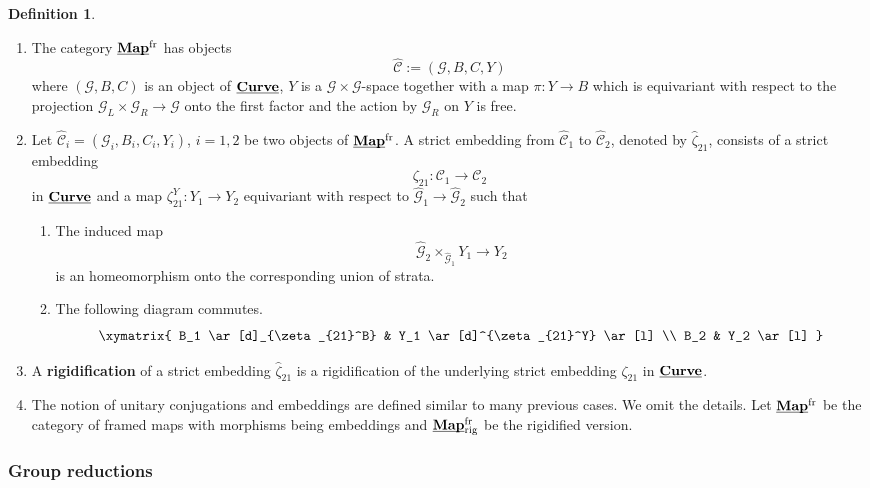 \documentclass[reqno, 10pt]{amsart}
\numberwithin{equation}{section}
\numberwithin{equation}{section}
\theoremstyle{definition}
\newtheorem{defn}[thm]{Definition}
\theoremstyle{remark}
\newcommand{\beqn}{\begin{equation*}}
\newcommand{\eeqn}{\end{equation*}}
\newcommand{\mc}{\mathcal}
\newcommand{\uds}[1]{\underline{\smash{#1}}}
\begin{document}
\begin{defn}\label{defn156}
\begin{enumerate}

\item The category $\uds{\bf Map}^{\rm fr}$ has objects
\beqn
\hat {\mc C}:= ({\mc G}, B, C, Y)
\eeqn
where $({\mc G}, B, C)$ is an object of $\uds{\bf Curve}$, $Y$ is a ${\mc G}\times {\mc G}$-space together with a map $\pi: Y  \to B$ which is equivariant with respect to the projection ${\mc G}_L \times {\mc G}_R \to {\mc G}$ onto the first factor and the action by ${\mc G}_R$ on $Y$ is free.  

\item Let $\hat {\mc C}_i = ({\mc G}_i, B_i, C_i, Y_i)$, $i = 1, 2$ be two objects of $\uds{\bf Map}^{\rm fr}$. A strict embedding from $\hat{\mc C}_1$ to $\hat {\mc C}_2$, denoted by $\hat \zeta_{21}$, consists of a strict embedding
\beqn
\zeta_{21}: {\mc C}_1 \to {\mc C}_2
\eeqn
in $\uds{\bf Curve}$ and a map $\zeta_{21}^Y: Y_1 \to Y_2$ equivariant with respect to $\hat {\mc G}_1 \to \hat{\mc G}_2$ such that 
\begin{enumerate}
    \item The induced map
    \beqn
    \hat {\mc G}_2 \times_{\hat {\mc G}_1} Y_1 \to Y_2
    \eeqn
    is an homeomorphism onto the corresponding union of strata. 
    
    \item The following diagram commutes.
\beqn
\xymatrix{ B_1  \ar[d]_{\zeta_{21}^B}   &  Y_1  \ar[d]^{\zeta_{21}^Y} \ar[l]    \\
B_2 & Y_2 \ar[l]    }
\eeqn
\end{enumerate}

\item A {\bf rigidification} of a strict embedding $\hat\zeta_{21}$ is a rigidification of the underlying strict embedding $\zeta_{21}$ in $\uds{\bf Curve}$.

\item The notion of unitary conjugations and embeddings are defined similar to many previous cases. We omit the details. Let $\uds{\bf Map}^{\rm fr}$ be the category of framed maps with morphisms being embeddings and $\uds{\bf Map}^{\rm fr}_{\rm rig}$ be the rigidified version.
\end{enumerate}
\end{defn}



\subsubsection{Group reductions} 
\end{document}
